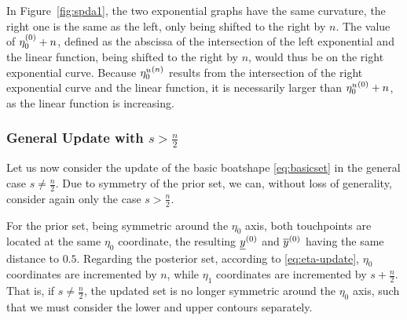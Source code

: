 In Figure~\ref{fig:spda1}, the two exponential graphs have the same curvature,
the right one is the same as the left, only being shifted to the right by $n$.
The value of $\eta_0^{(0)} + n$, defined as the abscissa of the intersection of the left exponential and the linear function,
being shifted to the right by $n$, would thus be on the right exponential curve.
Because ${\eta_0^u}^{(n)}$ results from the intersection of the right exponential curve and the linear function,
it is necessarily larger than ${\eta_0^u}^{(0)} + n$, as the linear function is increasing.

\subsubsection{General Update with \texorpdfstring{$s > \frac{n}{2}$}{s > n/2}}
\label{sec:generalupdate}

Let us now consider the update of the basic boatshape \eqref{eq:basicset} %
in the general case $s \neq \frac{n}{2}$.
Due to symmetry of the prior set, we can, without loss of generality,
consider again only the case $s > \frac{n}{2}$.

For the prior set, being symmetric around the $\eta_0$ axis,
both touchpoints are located at the same $\eta_0$ coordinate,
the resulting $\underline{y}^{(0)}$ and $\overline{y}^{(0)}$ having the same distance to $0.5$.
Regarding the posterior set, according to \eqref{eq:eta-update},
$\eta_0$ coordinates are incremented by $n$, while
$\eta_1$ coordinates are incremented by $s+\frac{n}{2}$.
That is, if $s \neq \frac{n}{2}$, the updated set is no longer symmetric around the $\eta_0$ axis,
such that we must consider the lower and upper contours separately.

